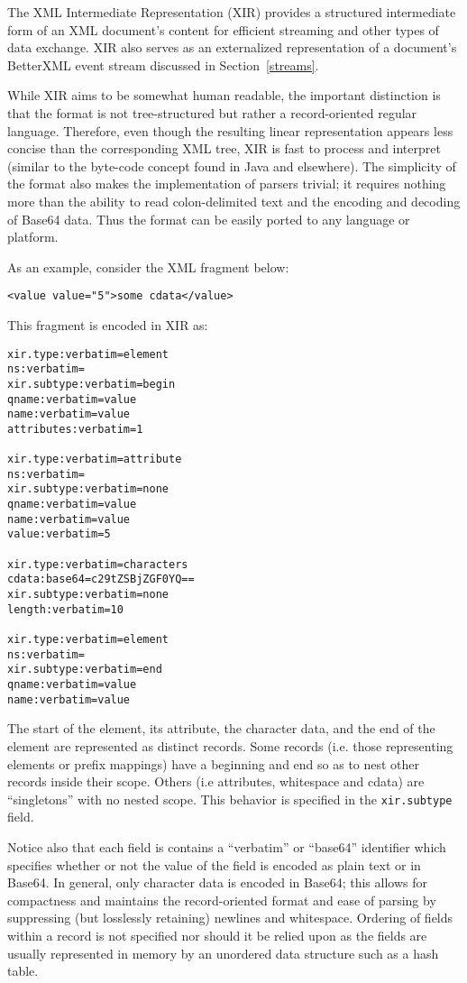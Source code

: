 
The XML Intermediate Representation (XIR) provides a structured
intermediate form of an XML document's content for efficient streaming
and other types of data exchange. XIR also serves as an externalized
representation of a document's BetterXML event stream discussed in
Section~\ref{streams}.

While XIR aims to be somewhat human readable, the important
distinction is that the format is not tree-structured but rather a
record-oriented regular language. Therefore, even though the resulting
linear representation appears less concise than the corresponding XML
tree, XIR is fast to process and interpret (similar to the byte-code
concept found in Java and elsewhere). The simplicity of the format
also makes the implementation of parsers trivial; it requires nothing
more than the ability to read colon-delimited text and the encoding
and decoding of Base64 data. Thus the format can be easily ported to
any language or platform.

As an example, consider the XML fragment below:
\begin{lstlisting}
<value value="5">some cdata</value>
\end{lstlisting}
This fragment is encoded in XIR as:
\begin{lstlisting}
xir.type:verbatim=element
ns:verbatim=
xir.subtype:verbatim=begin
qname:verbatim=value
name:verbatim=value
attributes:verbatim=1

xir.type:verbatim=attribute
ns:verbatim=
xir.subtype:verbatim=none
qname:verbatim=value
name:verbatim=value
value:verbatim=5

xir.type:verbatim=characters
cdata:base64=c29tZSBjZGF0YQ==
xir.subtype:verbatim=none
length:verbatim=10

xir.type:verbatim=element
ns:verbatim=
xir.subtype:verbatim=end
qname:verbatim=value
name:verbatim=value
\end{lstlisting}
The start of the element, its attribute, the character data, and the
end of the element are represented as distinct records.  Some records
(i.e. those representing elements or prefix mappings) have a beginning
and end so as to nest other records inside their scope. Others (i.e
attributes, whitespace and cdata) are ``singletons'' with no nested
scope. This behavior is specified in the \lstinline{xir.subtype}
field.  

Notice also that each field is contains a ``verbatim'' or ``base64''
identifier which specifies whether or not the value of the field is
encoded as plain text or in Base64.  In general, only character data
is encoded in Base64; this allows for compactness and maintains the
record-oriented format and ease of parsing by suppressing (but
losslessly retaining) newlines and whitespace. Ordering of fields
within a record is not specified nor should it be relied upon as the
fields are usually represented in memory by an unordered data
structure such as a hash table.

